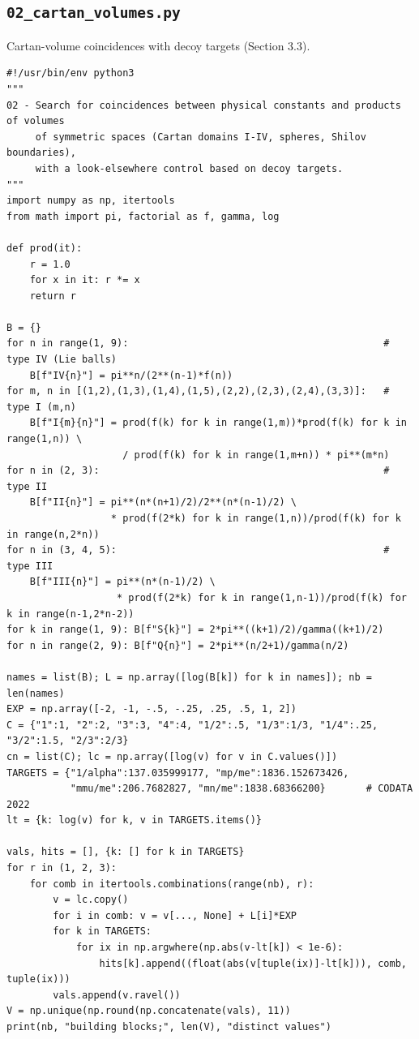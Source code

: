 \documentclass[11pt,a4paper]{article}
\begin{document}
\subsection{\texttt{02\_cartan\_volumes.py}}
Cartan-volume coincidences with decoy targets (Section 3.3).
\begin{lstlisting}
#!/usr/bin/env python3
"""
02 - Search for coincidences between physical constants and products of volumes
     of symmetric spaces (Cartan domains I-IV, spheres, Shilov boundaries),
     with a look-elsewhere control based on decoy targets.
"""
import numpy as np, itertools
from math import pi, factorial as f, gamma, log

def prod(it):
    r = 1.0
    for x in it: r *= x
    return r

B = {}
for n in range(1, 9):                                            # type IV (Lie balls)
    B[f"IV{n}"] = pi**n/(2**(n-1)*f(n))
for m, n in [(1,2),(1,3),(1,4),(1,5),(2,2),(2,3),(2,4),(3,3)]:   # type I (m,n)
    B[f"I{m}{n}"] = prod(f(k) for k in range(1,m))*prod(f(k) for k in range(1,n)) \
                    / prod(f(k) for k in range(1,m+n)) * pi**(m*n)
for n in (2, 3):                                                 # type II
    B[f"II{n}"] = pi**(n*(n+1)/2)/2**(n*(n-1)/2) \
                  * prod(f(2*k) for k in range(1,n))/prod(f(k) for k in range(n,2*n))
for n in (3, 4, 5):                                              # type III
    B[f"III{n}"] = pi**(n*(n-1)/2) \
                   * prod(f(2*k) for k in range(1,n-1))/prod(f(k) for k in range(n-1,2*n-2))
for k in range(1, 9): B[f"S{k}"] = 2*pi**((k+1)/2)/gamma((k+1)/2)
for n in range(2, 9): B[f"Q{n}"] = 2*pi**(n/2+1)/gamma(n/2)

names = list(B); L = np.array([log(B[k]) for k in names]); nb = len(names)
EXP = np.array([-2, -1, -.5, -.25, .25, .5, 1, 2])
C = {"1":1, "2":2, "3":3, "4":4, "1/2":.5, "1/3":1/3, "1/4":.25, "3/2":1.5, "2/3":2/3}
cn = list(C); lc = np.array([log(v) for v in C.values()])
TARGETS = {"1/alpha":137.035999177, "mp/me":1836.152673426,
           "mmu/me":206.7682827, "mn/me":1838.68366200}       # CODATA 2022
lt = {k: log(v) for k, v in TARGETS.items()}

vals, hits = [], {k: [] for k in TARGETS}
for r in (1, 2, 3):
    for comb in itertools.combinations(range(nb), r):
        v = lc.copy()
        for i in comb: v = v[..., None] + L[i]*EXP
        for k in TARGETS:
            for ix in np.argwhere(np.abs(v-lt[k]) < 1e-6):
                hits[k].append((float(abs(v[tuple(ix)]-lt[k])), comb, tuple(ix)))
        vals.append(v.ravel())
V = np.unique(np.round(np.concatenate(vals), 11))
print(nb, "building blocks;", len(V), "distinct values")


\end{lstlisting}
\end{document}
